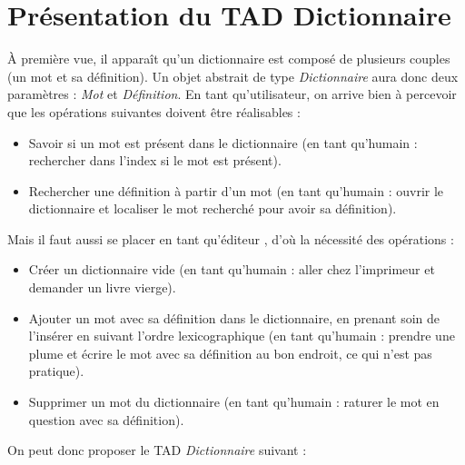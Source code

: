 \documentclass[a4paper, titlepage]{livret} %
\begin{document}
		\section{Présentation du TAD Dictionnaire}
			À première vue, il apparaît qu'un dictionnaire est composé de plusieurs couples (un mot et sa définition).
			Un objet abstrait de type \textit{Dictionnaire} aura donc deux paramètres : \textit{Mot} et \textit{Définition}.
			En tant qu'utilisateur, on arrive bien à percevoir que les opérations suivantes doivent être réalisables :
			\begin{itemize}
				\item Savoir si un mot est présent dans le dictionnaire (en tant qu'\og humain \fg{} : rechercher dans l'index si le mot est présent).
				\item Rechercher une définition à partir d'un mot (en tant qu'\og humain \fg{} : ouvrir le dictionnaire et localiser le mot recherché pour avoir sa définition).
			\end{itemize}
			Mais il faut aussi se placer en tant qu'\og éditeur \fg, d'où la nécessité des opérations :
			\begin{itemize}
				\item Créer un dictionnaire \og vide \fg{} (en tant qu'\og humain \fg{} : aller chez l'imprimeur et demander un livre vierge).
				\item Ajouter un mot avec sa définition dans le dictionnaire, en prenant soin de l'insérer en suivant l'ordre lexicographique (en tant qu'\og humain \fg{} : prendre une plume et écrire le mot avec sa définition au bon endroit, ce qui n'est pas pratique).
				\item Supprimer un mot du dictionnaire (en tant qu'\og humain \fg{} : raturer le mot en question avec sa définition).
			\end{itemize}
			On peut donc proposer le TAD \textit{Dictionnaire} suivant :\\
\end{document}
